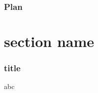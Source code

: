 \documentclass{beamer}
\begin{document}
\begin{frame}
    \frametitle{Plan}
    \tableofcontents
\end{frame}

\section{section name}
\begin{frame}
    \frametitle{title}
    abc
\end{frame} 
\end{document}
